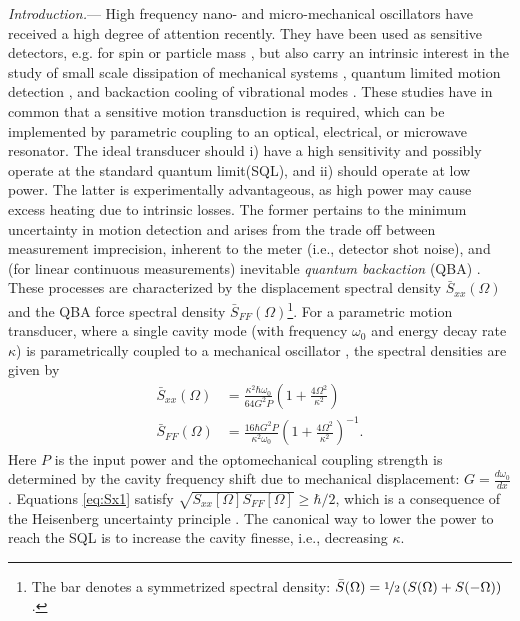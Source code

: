 \documentclass[twocolumn,english,aps,prl,superscriptaddress,showpacs,preprintnumbers]{revtex4}
\begin{document}
\textit{Introduction.}--- High frequency nano- and micro-mechanical
oscillators have received a high degree of attention recently. They
have been used as sensitive detectors, e.g. for spin \cite{rugar_single_2004}
or particle mass \cite{naik_towards_2009}, but also carry
an intrinsic interest in the study of small scale dissipation of mechanical
systems \cite{steele_strong_2009}, quantum limited motion detection \cite{teufel_nanomechanical_2009}, 
and backaction cooling of vibrational modes \cite{kippenberg_cavity_2008}. These studies have in common 
that a sensitive motion transduction is required, which can be implemented 
by parametric coupling to an optical, electrical, or microwave resonator. 
The ideal transducer should i) have a high
sensitivity and possibly operate at the standard quantum limit(SQL),
and ii) should operate at low power. The latter is experimentally advantageous,
as high power may cause excess heating due to intrinsic losses. The former
pertains to the minimum uncertainty in motion detection and arises
from the trade off between measurement imprecision, inherent to the
meter (i.e., detector shot noise), and (for linear continuous measurements)
inevitable \textit{quantum backaction} (QBA) \citep{caves_quantum_1982,clerk_introduction_2008}.
These processes are characterized by the displacement spectral density
$\bar{S}_{xx}(\Omega)$ and the QBA force spectral density $\bar{S}_{FF}(\Omega)$\footnote{The bar denotes a symmetrized spectral density: $\bar{S}(\Omega)=\nicefrac{1}{2}\left(S(\Omega)+S(-\Omega)\right)$.}. For a parametric motion transducer, where a single cavity mode
(with frequency $\omega_{0}$ and energy decay rate $\kappa$) is parametrically
coupled to a mechanical oscillator \citep{braginsky_measurement_1977},
the spectral densities are given by \begin{align}
\bar{S}_{xx}(\Omega) & =\frac{\kappa^{2}\hbar\omega_{0}}{64G^{2}P}\left(1+\frac{4\Omega^{2}}{\kappa^{2}}\right)\label{eq:Sx1}\\
\bar{S}_{FF}(\Omega) & =\frac{16\hbar G^{2}P}{\kappa^{2}\omega_{0}}\left(1+\frac{4\Omega^{2}}{\kappa^{2}}\right)^{-1}.\nonumber \end{align}
Here $P$ is the input power and the optomechanical coupling strength is determined by the cavity frequency
shift due to mechanical displacement: $G=\frac{d\omega_{0}}{dx}$. Equations \ref{eq:Sx1} satisfy 
$\sqrt{S_{xx}[\Omega]S_{FF}[\Omega]}\geq\hbar/2$, which is a consequence of  the Heisenberg uncertainty 
principle \citep{Braginsky_quantum_1992}.
The canonical way to lower the power to reach the SQL is to increase the cavity finesse, i.e., decreasing $\kappa$. 
\end{document}

